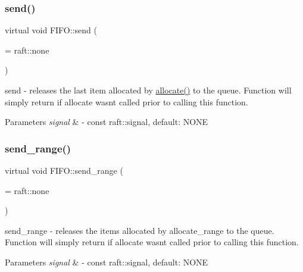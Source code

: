 \subsubsection{\texorpdfstring{send()}{send()}}
{\footnotesize\ttfamily virtual void F\+I\+F\+O\+::send (\begin{DoxyParamCaption}\item[{const raft\+::signal}]{ = {\ttfamily raft\+:\+:none} }\end{DoxyParamCaption})\hspace{0.3cm}{\ttfamily [pure virtual]}}

send -\/ releases the last item allocated by \hyperlink{class_f_i_f_o_a43ad12d67e3611fafae4d6ed862c60b9}{allocate()} to the queue. Function will simply return if allocate wasn\textquotesingle{}t called prior to calling this function. 
\begin{DoxyParams}{Parameters}
{\em signal} & -\/ const raft\+::signal, default\+: N\+O\+NE \\
\hline
\end{DoxyParams}
\hypertarget{class_f_i_f_o_ac0be4de6db251e1a2e6dcc97a5d4a584}{}\label{class_f_i_f_o_ac0be4de6db251e1a2e6dcc97a5d4a584} 
\subsubsection{\texorpdfstring{send\+\_\+range()}{send\_range()}}
{\footnotesize\ttfamily virtual void F\+I\+F\+O\+::send\+\_\+range (\begin{DoxyParamCaption}\item[{const raft\+::signal}]{ = {\ttfamily raft\+:\+:none} }\end{DoxyParamCaption})\hspace{0.3cm}{\ttfamily [pure virtual]}}

send\+\_\+range -\/ releases the items allocated by allocate\+\_\+range to the queue. Function will simply return if allocate wasn\textquotesingle{}t called prior to calling this function. 
\begin{DoxyParams}{Parameters}
{\em signal} & -\/ const raft\+::signal, default\+: N\+O\+NE \\
\hline
\end{DoxyParams}
\hypertarget{class_f_i_f_o_a11422695c75c05ad2c60e662553f2667}{}\label{class_f_i_f_o_a11422695c75c05ad2c60e662553f2667} 
